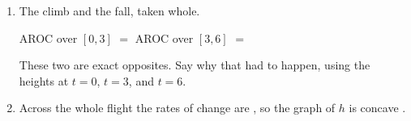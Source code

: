 \documentclass[10pt]{article}
\begin{document}
\begin{tcolorbox}[colback=white, colframe=black!40,
    title=\textbf{Tier A --- Approaching Proficiency},
    fonttitle=\bfseries, arc=2mm, left=3mm, right=3mm, top=2mm, bottom=2mm]
\begin{enumerate}[itemsep=8pt]
        \vspace{0.05in}

  \item The climb and the fall, taken whole.

        \vspace{0.05in}
        AROC over $[0,3]$ $=$ \blank{2.6cm} \qquad
        AROC over $[3,6]$ $=$ \blank{2.6cm}

        \vspace{0.05in}
        These two are exact opposites. Say why that had to happen, using the
        heights at $t = 0$, $t = 3$, and $t = 6$.

        \vspace{0.05in}

  \item Across the whole flight the rates of change are \blank{2.4cm}, so the
        graph of $h$ is concave \blank{1.4cm}.
\end{enumerate}
\end{tcolorbox}

\vspace{0.1in}
\end{document}
